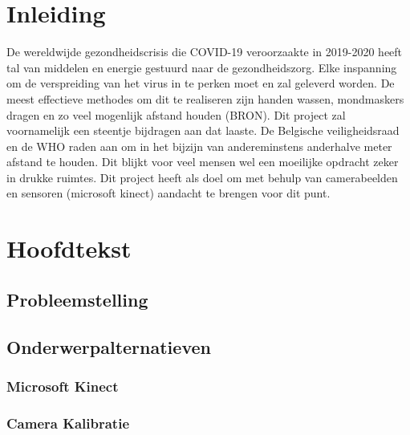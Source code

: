 \documentclass[a4paper,11pt]{article}
\begin{document}
	\begin{abstract}
		
	\end{abstract}
	
	
	
	\tableofcontents
	\newpage
	
	
	
	
	
	
	
	
	\section{Inleiding}
		De wereldwijde gezondheidscrisis die COVID-19 veroorzaakte in 2019-2020 heeft tal van middelen en energie gestuurd naar de gezondheidszorg. Elke inspanning om de verspreiding van het virus in te perken moet en zal geleverd worden. De meest effectieve methodes om dit te realiseren zijn handen wassen, mondmaskers dragen en zo veel mogenlijk afstand houden (BRON). Dit project zal voornamelijk een steentje bijdragen aan dat laaste. De Belgische veiligheidsraad en de WHO raden aan om in het bijzijn van andereminstens anderhalve meter afstand te houden. Dit blijkt voor veel mensen wel een moeilijke opdracht zeker in drukke ruimtes. Dit project heeft als doel om met behulp van camerabeelden en sensoren (microsoft kinect) aandacht te brengen voor dit punt.
	\section{Hoofdtekst}
	\subsection{Probleemstelling}
	\subsection{Onderwerpalternatieven}
	\subsubsection{Microsoft Kinect}
	\subsubsection{Camera Kalibratie}
\end{document}
